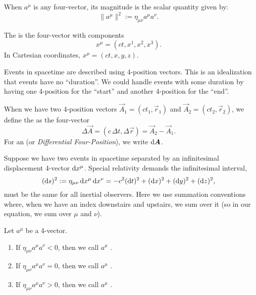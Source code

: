 When $a^{\mu}$ is any four-vector, its magnitude is the scalar quantity
given by:
\begin{equation}
\|a^{\mu}\|^{2} := \eta_{\mu\nu}a^{\mu}a^{\nu}.
\end{equation}

\begin{definition}
The  is the four-vector with components
\begin{equation*}
x^{\mu} = (ct, x^{1}, x^{2}, x^{3}).
\end{equation*}
In Cartesian coordinates, $x^{\mu} = (ct, x, y, z)$.
\end{definition}

Events in spacetime are described using 4-position vectors. This is an
idealization that events have no ``duration''. We could handle events
with some duration by having one 4-position for the ``start'' and
another 4-position for the ``end''.

\begin{definition}
When we have two 4-position vectors $\vec{A}_{1}=(ct_{1},\vec{r}_{1})$
and $\vec{A}_{2}=(ct_{2},\vec{r}_{2})$, we define the
 as the four-vector
\begin{equation*}
\Delta\vec{A} = (c\,\Delta t,\Delta\vec{r}) = \vec{A}_{2} - \vec{A}_{1}.
\end{equation*}
For an  (or
\emph{Differential Four-Position}), we write
$\mathrm{d}\boldsymbol{A}$.
\end{definition}

\M
Suppose we have two events in spacetime separated by an infinitesimal
displacement 4-vector $\mathrm{d} x^{\mu}$. Special relativity demands the
infinitesimal interval,
\begin{equation}
(\mathrm{d} s)^{2} := \eta_{\mu\nu}\,\mathrm{d} x^{\mu}\,\mathrm{d} x^{\nu} = -c^{2}(\mathrm{d} t)^{2} + (\mathrm{d} x)^{2} + (\mathrm{d} y)^{2} + (\mathrm{d} z)^{2},
\end{equation}
must be the same for all inertial observers. Here we use summation
conventions where, when we have an index downstairs and upstairs, we sum
over it (so in our equation, we sum over $\mu$ and $\nu$).

\begin{definition} Let $a^{\mu}$ be a 4-vector.
  \begin{enumerate}
  \item If $\eta_{\mu\nu}a^{\mu}a^{\nu} < 0$, then we call $a^{\mu}$ .
  \item If $\eta_{\mu\nu}a^{\mu}a^{\nu} = 0$, then we call $a^{\mu}$ .
  \item If $\eta_{\mu\nu}a^{\mu}a^{\nu} > 0$, then we call $a^{\mu}$ .
  \end{enumerate}
\end{definition}

